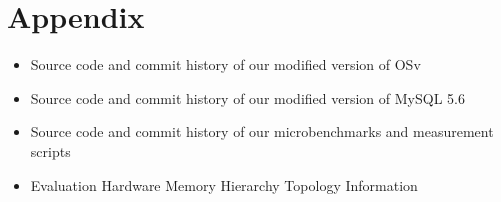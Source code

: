 \documentclass[12pt,a4paper]{book}
\begin{document}
\backmatter

\chapter{Appendix}
\blindtext
\begin{itemize}
    \item Source code and commit history of our modified version of OSv
    \item Source code and commit history of our modified version of MySQL 5.6
    \item Source code and commit history of our microbenchmarks and measurement scripts
    \item Evaluation Hardware Memory Hierarchy Topology Information
\end{itemize}

\cleardoublepage
{}
{}
\printbibliography
\end{document}
